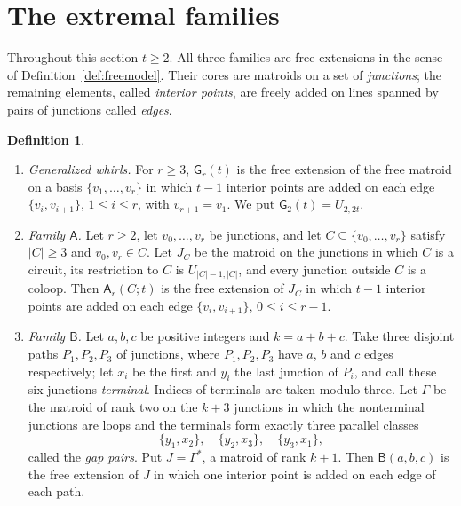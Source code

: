 \documentclass[11pt]{amsart}
\theoremstyle{definition}
\newtheorem{definition}[theorem]{Definition}
\theoremstyle{remark}
\numberwithin{equation}{section}
\newcommand{\GW}{\mathsf{G}}
\newcommand{\FA}{\mathsf{A}}
\newcommand{\FB}{\mathsf{B}}
\begin{document}
\section{The extremal families}\label{sec:families}

Throughout this section $t\ge2$. All three families are free extensions in the sense of Definition~\ref{def:freemodel}. Their cores are matroids on a set of \emph{junctions}; the remaining elements, called \emph{interior points}, are freely added on lines spanned by pairs of junctions called \emph{edges}.

\begin{definition}\label{def:families}
\begin{enumerate}[label=(\alph*), leftmargin=2em]
\item \emph{Generalized whirls.} For $r\ge3$, $\GW_r(t)$ is the free extension of the free matroid on a basis $\{v_1,\dots,v_r\}$ in which $t-1$ interior points are added on each edge $\{v_i,v_{i+1}\}$, $1\le i\le r$, with $v_{r+1}=v_1$. We put $\GW_2(t)=U_{2,2t}$.
\item \emph{Family $\FA$.} Let $r\ge2$, let $v_0,\dots,v_r$ be junctions, and let $C\subseteq\{v_0,\dots,v_r\}$ satisfy $|C|\ge3$ and $v_0,v_r\in C$. Let $J_C$ be the matroid on the junctions in which $C$ is a circuit, its restriction to $C$ is $U_{|C|-1,|C|}$, and every junction outside $C$ is a coloop. Then $\FA_r(C;t)$ is the free extension of $J_C$ in which $t-1$ interior points are added on each edge $\{v_i,v_{i+1}\}$, $0\le i\le r-1$.
\item \emph{Family $\FB$.} Let $a,b,c$ be positive integers and $k=a+b+c$. Take three disjoint paths $P_1,P_2,P_3$ of junctions, where $P_1,P_2,P_3$ have $a$, $b$ and $c$ edges respectively; let $x_i$ be the first and $y_i$ the last junction of $P_i$, and call these six junctions \emph{terminal}. Indices of terminals are taken modulo three. Let $\Gamma$ be the matroid of rank two on the $k+3$ junctions in which the nonterminal junctions are loops and the terminals form exactly three parallel classes
\[
\{y_1,x_2\},\quad\{y_2,x_3\},\quad\{y_3,x_1\},
\]
called the \emph{gap pairs}. Put $J=\Gamma^*$, a matroid of rank $k+1$. Then $\FB(a,b,c)$ is the free extension of $J$ in which one interior point is added on each edge of each path.
\end{enumerate}
\end{definition}
\end{document}
